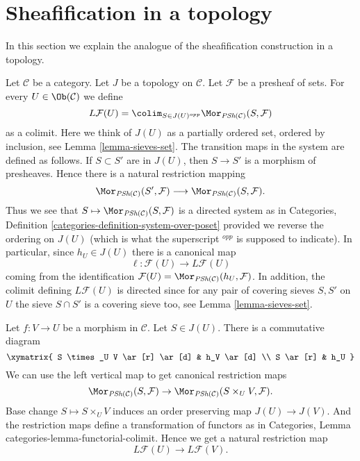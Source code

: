 \section{Sheafification in a topology}
\label{section-sheafification-topology}

\noindent
In this section we explain the analogue of the
sheafification construction in a topology.

\medskip\noindent
Let $\mathcal{C}$ be a category.
Let $J$ be a topology on $\mathcal{C}$.
Let $\mathcal{F}$ be a presheaf of sets.
For every $U \in \Ob(\mathcal{C})$ we
define
$$
L\mathcal{F}(U)
=
\colim_{S \in J(U)^{opp}}
\Mor_{\textit{PSh}(\mathcal{C})}(S, \mathcal{F})
$$
as a colimit. Here we think of $J(U)$ as a partially ordered set,
ordered by inclusion, see Lemma \ref{lemma-sieves-set}. The transition
maps in the system are defined as follows.
If $S \subset S'$ are in $J(U)$, then $S \to S'$ is
a morphism of presheaves. Hence there is a natural restriction
mapping
$$
\Mor_{\textit{PSh}(\mathcal{C})}(S', \mathcal{F})
\longrightarrow
\Mor_{\textit{PSh}(\mathcal{C})}(S, \mathcal{F}).
$$
Thus we see that
$S \mapsto \Mor_{\textit{PSh}(\mathcal{C})}(S, \mathcal{F})$
is a directed system as in Categories,
Definition \ref{categories-definition-system-over-poset}
provided we reverse the ordering
on $J(U)$ (which is what the superscript ${}^{opp}$ is supposed to
indicate). In particular, since $h_U \in J(U)$
there is a canonical map
$$
\ell : \mathcal{F}(U) \longrightarrow L\mathcal{F}(U)
$$
coming from the identification
$\mathcal{F}(U) = \Mor_{\textit{PSh}(\mathcal{C})}(h_U, \mathcal{F})$.
In addition, the colimit defining $L\mathcal{F}(U)$ is directed
since for any pair of covering sieves $S, S'$ on $U$ the
sieve $S \cap S'$ is a covering sieve too, see Lemma \ref{lemma-sieves-set}.

\medskip\noindent
Let $f : V \to U$ be a morphism in $\mathcal{C}$.
Let $S \in J(U)$. There is a commutative diagram
$$
\xymatrix{
S \times_U V \ar[r] \ar[d] & h_V \ar[d] \\
S \ar[r] & h_U
}
$$
We can use the left vertical map to get canonical restriction maps
$$
\Mor_{\textit{PSh}(\mathcal{C})}(S, \mathcal{F})
\to \Mor_{\textit{PSh}(\mathcal{C})}(S \times_U V, \mathcal{F}).
$$
Base change $S \mapsto S \times_U V$ induces an order
preserving map $J(U) \to J(V)$. And the restriction maps
define a transformation of functors as in
Categories, Lemma {categories-lemma-functorial-colimit}.
Hence we get a natural restriction map
$$
L\mathcal{F}(U) \longrightarrow L\mathcal{F}(V).
$$

